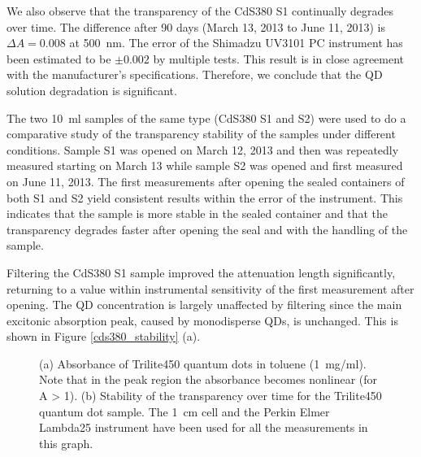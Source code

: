 \documentclass[cits]{JINST}
\begin{document}
We also observe that the transparency of the CdS380 S1 continually degrades over time. The difference after 90 days (March 13, 2013 to June 11, 2013) is $\Delta A = 0.008$ at 500~nm. The error of the Shimadzu UV3101 PC instrument has been estimated to be $\pm 0.002$ by multiple tests. This result is in close agreement with the manufacturer's specifications. Therefore, we conclude that the QD solution degradation is significant.
 
The two 10~ml samples of the same type (CdS380 S1 and S2) were used to do a comparative study of the transparency stability of the samples under different conditions. Sample S1 was opened on March 12, 2013 and then was repeatedly measured starting on March 13 while sample S2 was opened and first measured on June 11, 2013. The first measurements after opening the sealed containers of both S1 and S2 yield consistent results within the error of the instrument. This indicates that the sample is more stable in the sealed container and that the transparency degrades faster after opening the seal and with the handling of the sample.    

Filtering the CdS380 S1 sample improved the attenuation length significantly, returning to a value within instrumental sensitivity of the first measurement after opening. The QD concentration is largely unaffected by filtering since the main excitonic absorption peak, caused by monodisperse QDs, is unchanged. This is shown in Figure \ref{cds380_stability} (a).

\begin{figure}
        \begin{center}
        \caption[]{(a) Absorbance of Trilite450 quantum dots in toluene (1~mg/ml). Note that in the peak region the absorbance becomes nonlinear (for A > 1). (b) Stability of the transparency over time for the Trilite450 quantum dot sample. The 1~cm cell and the Perkin Elmer Lambda25 instrument have been used for all the measurements in this graph. \label{trilite450_stability}}
        \end{center}
\end{figure}
\end{document}
